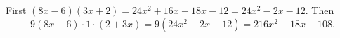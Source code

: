 First $(8x-6)(3x+2)=24x^2+16x-18x-12=24x^2-2x-12$. Then
\[9(8x-6)\cdot1\cdot(2+3x)=9(24x^2-2x-12)=\boxed{216x^2-18x-108}.\]
